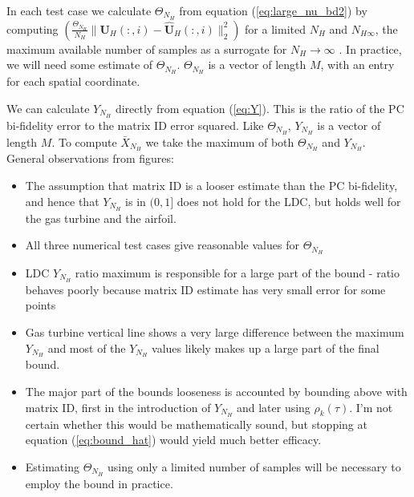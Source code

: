 \documentclass{report}
\begin{document}
In each test case we calculate $\Theta_{N_H}$ from equation (\ref{eq:large_nu_bd2}) by computing $\left(\frac{\Theta_{N_H}}{N_H}\|\bm{U}_H(:,i)-\hat{\bm{U}}_H(:,i)\|^2_2\right)$ for a limited $N_H$ and $N_{H\infty}$, the maximum available number of samples as a surrogate for $N_H\rightarrow\infty$ . In practice, we will need some estimate of $\Theta_{N_H}$. $\Theta_{N_H}$ is a vector of length $M$, with an entry for each spatial coordinate. 

We can calculate $Y_{N_H}$ directly from equation (\ref{eq:Y}). This is the ratio of the PC bi-fidelity error to the matrix ID error squared. Like $\Theta_{N_H}$, $Y_{N_H}$ is a vector of length $M$. To compute $\bar{X}_{N_H}$ we take the maximum of both $\Theta_{N_H}$ and $Y_{N_H}$. \\



General observations from figures: 
\begin{itemize}
\item The assumption that matrix ID is a looser estimate than the PC bi-fidelity, and hence that $Y_{N_H}$ is in $(0,1]$ does not hold for the LDC, but holds well for the gas turbine and the airfoil. 
\item All three numerical test cases give reasonable values for $\Theta_{N_H}$
\item LDC $Y_{N_H}$ ratio maximum is responsible for a large part of the bound - ratio behaves poorly because matrix ID estimate has very small error for some points
\item Gas turbine vertical line shows a very large difference between the maximum $Y_{N_H}$ and most of the $Y_{N_H}$ values likely makes up a large part of the final bound.
\item The major part of the bounds looseness is accounted by bounding above with matrix ID, first in the introduction of $Y_{N_H}$ and later using $\rho_k(\tau)$. I'm not certain whether this would be mathematically sound, but stopping at equation (\ref{eq:bound_hat}) would yield much better efficacy. 
\item Estimating  $\Theta_{N_H}$ using only a limited number of samples will be necessary to  employ the bound in practice.
\end{itemize}
\end{document}
